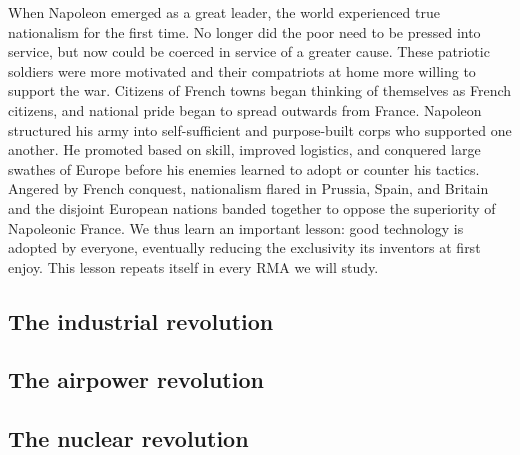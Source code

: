 \documentclass[nobib]{tufte-handout}
\begin{document}
When Napoleon emerged as a great leader, the world 
experienced true nationalism for the first time. No 
longer did the poor need to be pressed into service, 
but now could be coerced in service of a greater cause. 
These patriotic soldiers were more motivated and 
their compatriots at home more willing to support 
the war. Citizens of French towns began thinking of 
themselves as French citizens, and national pride 
began to spread outwards from France. Napoleon structured his 
army into self-sufficient and purpose-built corps who supported 
one another. He promoted based on skill, improved logistics, 
and conquered large swathes of Europe before his enemies learned 
to adopt or counter his tactics. Angered by French conquest, 
nationalism flared in Prussia, Spain, and Britain and 
the disjoint European nations banded together to oppose the 
superiority of Napoleonic France. We thus learn an important lesson:
good technology is adopted by everyone, eventually reducing the 
exclusivity its inventors at first enjoy. This lesson repeats itself 
in every RMA we will study. 

\subsection{The industrial revolution}
\subsection{The airpower revolution}
\subsection{The nuclear revolution}
\end{document}
